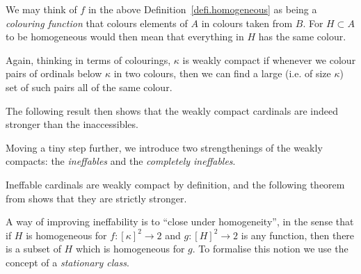 \documentclass[../../main]{subfiles}
\begin{document}

We may think of $f$ in the above Definition~\ref{defi.homogeneous} as being a \textit{colouring function} that colours elements of $A$ in colours taken from $B$. For $H\subset A$ to be homogeneous would then mean that everything in $H$ has the same colour.


Again, thinking in terms of colourings, $\kappa$ is weakly compact if whenever we colour pairs of ordinals below $\kappa$ in two colours, then we can find a large (i.e. of size $\kappa$) set of such pairs all of the same colour.

\qquad The following result then shows that the weakly compact cardinals are indeed stronger than the inaccessibles.


Moving a tiny step further, we introduce two strengthenings of the weakly compacts: the \textit{ineffables} and the \textit{completely ineffables}.


Ineffable cardinals are weakly compact by definition, and the following theorem from \cite{Friedman} shows that they are strictly stronger.


A way of improving ineffability is to ``close under homogeneity'', in the sense that if $H$ is homogeneous for $f\colon[\kappa]^2\to 2$ and $g\colon[H]^2\to 2$ is any function, then there is a subset of $H$ which is homogeneous for $g$. To formalise this notion we use the concept of a \textit{stationary class}.

\end{document}
